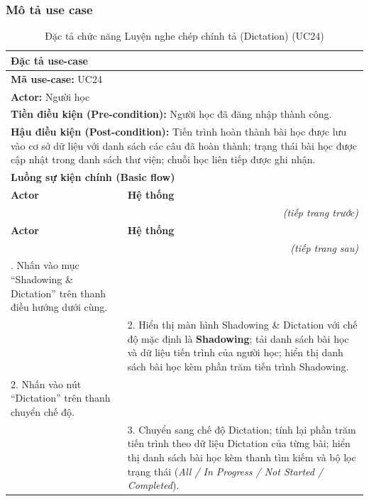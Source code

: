\subsubsection{Mô tả use case}
\renewcommand{\arraystretch}{1.3}
\setlength{\tbu}{\dimexpr(\linewidth - 4\tabcolsep - 3\arrayrulewidth)/2\relax}
\begin{longtable}{|p{\tbu}|p{\tbu}|}
    \caption{Đặc tả chức năng Luyện nghe chép chính tả (Dictation) (UC24)} \label{tab:uc24_spec} \\
    
    \hline
    \multicolumn{2}{|l|}{\textbf{Đặc tả use-case}} \\ \hline
    \multicolumn{2}{|l|}{\textbf{Mã use-case:} UC24} \\ \hline
    \multicolumn{2}{|l|}{\textbf{Actor:} Người học} \\ \hline
    \multicolumn{2}{|p{\dimexpr\linewidth - 2\tabcolsep - 2\arrayrulewidth\relax}|}{\textbf{Tiền điều kiện (Pre-condition):} Người học đã đăng nhập thành công.} \\ \hline
    \multicolumn{2}{|p{\dimexpr\linewidth - 2\tabcolsep - 2\arrayrulewidth\relax}|}{\textbf{Hậu điều kiện (Post-condition):} Tiến trình hoàn thành bài học được lưu vào cơ sở dữ liệu với danh sách các câu đã hoàn thành; trạng thái bài học được cập nhật trong danh sách thư viện; chuỗi học liên tiếp được ghi nhận.} \\ \hline
    \multicolumn{2}{|l|}{\textbf{Luồng sự kiện chính (Basic flow)}} \\ \hline
    \textbf{Actor} & \textbf{Hệ thống} \\ \hline
    \endfirsthead
    \multicolumn{2}{r}{\textit{(tiếp trang trước)}} \\
    \hline
    \textbf{Actor} & \textbf{Hệ thống} \\ \hline
    \endhead
    \hline
    \multicolumn{2}{r}{\textit{(tiếp trang sau)}} \\
    \endfoot
    \endlastfoot
    1. Nhấn vào mục ``Shadowing \& Dictation'' trên thanh điều hướng dưới cùng. & \\ \hline
    & 2. Hiển thị màn hình Shadowing \& Dictation với chế độ mặc định là \textbf{Shadowing}; tải danh sách bài học và dữ liệu tiến trình của người học; hiển thị danh sách bài học kèm phần trăm tiến trình Shadowing. \\ \hline
    2. Nhấn vào nút ``Dictation'' trên thanh chuyển chế độ. & \\ \hline
    & 3. Chuyển sang chế độ Dictation; tính lại phần trăm tiến trình theo dữ liệu Dictation của từng bài; hiển thị danh sách bài học kèm thanh tìm kiếm và bộ lọc trạng thái (\textit{All / In Progress / Not Started / Completed}). \\ \hline

\end{longtable}
